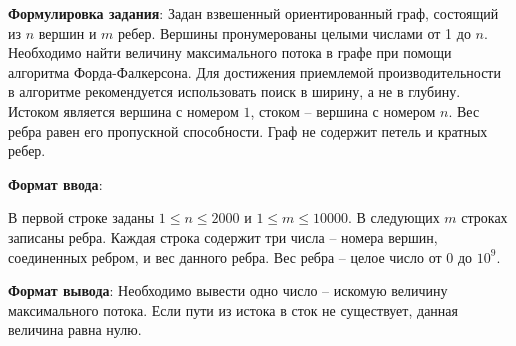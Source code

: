 
\textbf{Формулировка задания}: Задан взвешенный ориентированный граф, состоящий из $n$ вершин и $m$ ребер. Вершины пронумерованы целыми числами от 1 до $n$. Необходимо найти величину максимального потока в графе при помощи алгоритма Форда-Фалкерсона. Для достижения приемлемой производительности в алгоритме рекомендуется использовать поиск в ширину, а не в глубину. Истоком является вершина с номером $1$, стоком – вершина с номером $n$. Вес ребра равен его пропускной способности. Граф не содержит петель и кратных ребер. 

\par

\textbf{Формат ввода}: 

В первой строке заданы $1 \leq n \leq 2000$ и $1 \leq m \leq 10000$. В следующих $m$ строках записаны ребра. Каждая строка содержит три числа – номера вершин, соединенных ребром, и вес данного ребра. Вес ребра – целое число от 0 до $10^9$.  

\textbf{Формат вывода}: Необходимо вывести одно число – искомую величину максимального потока. Если пути из истока в сток не существует, данная величина равна нулю.  

\pagebreak

